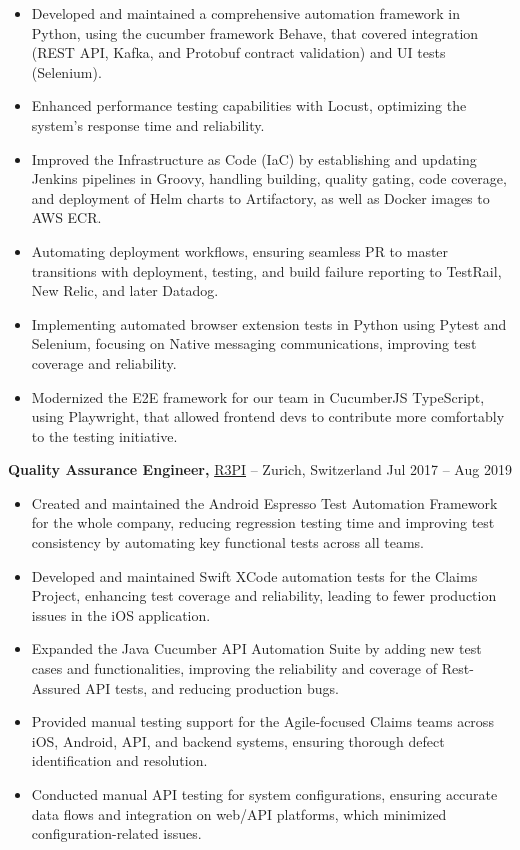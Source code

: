 \documentclass[11pt]{article}       %
\begin{document}
\begin{itemize}
    \item Developed and maintained a comprehensive automation framework in Python, using the cucumber framework Behave, that covered integration (REST API, Kafka, and Protobuf contract validation) and UI tests (Selenium).
    \item Enhanced performance testing capabilities with Locust, optimizing the system's response time and reliability.
    \item Improved the Infrastructure as Code (IaC) by establishing and updating Jenkins pipelines in Groovy, handling building, quality gating, code coverage, and deployment of Helm charts to Artifactory, as well as Docker images to AWS ECR.
    \item Automating deployment workflows, ensuring seamless PR to master transitions with deployment, testing, and build failure reporting to TestRail, New Relic, and later Datadog.
    \item Implementing automated browser extension tests in Python using Pytest and Selenium, focusing on Native messaging communications, improving test coverage and reliability.
    \item Modernized the E2E framework for our team in CucumberJS TypeScript, using Playwright, that allowed frontend devs to contribute more comfortably to the testing initiative.
\end{itemize}

\textbf{Quality Assurance Engineer,} \href{https://www.solera.com/}{R3PI} -- Zurich, Switzerland \hfill Jul 2017 – Aug 2019
\vspace{-9pt}

\begin{itemize}
    \item Created and maintained the Android Espresso Test Automation Framework for the whole company, reducing regression testing time and improving test consistency by automating key functional tests across all teams.
    \item Developed and maintained Swift XCode automation tests for the Claims Project, enhancing test coverage and reliability, leading to fewer production issues in the iOS application.
    \item Expanded the Java Cucumber API Automation Suite by adding new test cases and functionalities, improving the reliability and coverage of Rest-Assured API tests, and reducing production bugs.
    \item Provided manual testing support for the Agile-focused Claims teams across iOS, Android, API, and backend systems, ensuring thorough defect identification and resolution.
    \item Conducted manual API testing for system configurations, ensuring accurate data flows and integration on web/API platforms, which minimized configuration-related issues.
\end{itemize}
\end{document}
